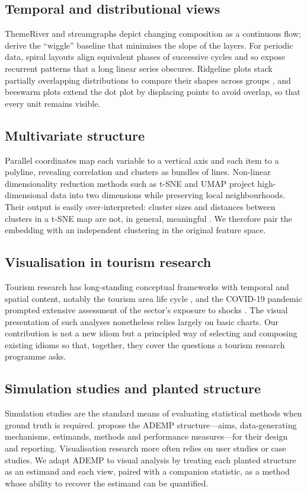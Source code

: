 \documentclass[11pt,a4paper]{article}
\begin{document}
\subsection{Temporal and distributional views}
ThemeRiver \citep{havre2000} and streamgraphs \citep{byron2008} depict changing composition as a continuous
flow; \citet{byron2008} derive the ``wiggle'' baseline that minimises the slope of the layers. For periodic
data, spiral layouts \citep{weber2001} align equivalent phases of successive cycles and so expose recurrent
patterns that a long linear series obscures. Ridgeline plots stack partially overlapping distributions to
compare their shapes across groups \citep{wilke2019}, and beeswarm plots extend the dot plot
\citep{wilkinson1999} by displacing points to avoid overlap, so that every unit remains visible.

\subsection{Multivariate structure}
Parallel coordinates \citep{inselberg1985} map each variable to a vertical axis and each item to a polyline,
revealing correlation and clusters as bundles of lines. Non-linear dimensionality reduction methods such as
t-SNE \citep{vandermaaten2008} and UMAP \citep{mcinnes2018} project high-dimensional data into two dimensions
while preserving local neighbourhoods. Their output is easily over-interpreted: cluster sizes and distances
between clusters in a t-SNE map are not, in general, meaningful \citep{wattenberg2016}. We therefore pair the
embedding with an independent clustering in the original feature space.

\subsection{Visualisation in tourism research}
Tourism research has long-standing conceptual frameworks with temporal and spatial content, notably the
tourism area life cycle \citep{butler1980}, and the COVID-19 pandemic prompted extensive assessment of the
sector's exposure to shocks \citep{gossling2021}. The visual presentation of such analyses nonetheless relies
largely on basic charts. Our contribution is not a new idiom but a principled way of selecting and composing
existing idioms so that, together, they cover the questions a tourism research programme asks.

\subsection{Simulation studies and planted structure}
Simulation studies are the standard means of evaluating statistical methods when ground truth is required.
\citet{morris2019} propose the ADEMP structure---aims, data-generating mechanisms, estimands, methods and
performance measures---for their design and reporting. Visualisation research more often relies on user
studies or case studies. We adapt ADEMP to visual analysis by treating each planted structure as an estimand
and each view, paired with a companion statistic, as a method whose ability to recover the estimand can be
quantified.
\end{document}
